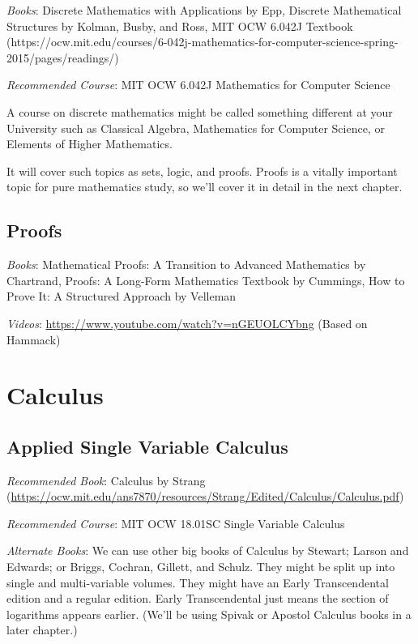 \documentclass[openany,10pt]{book}
\begin{document}
\textit{Books}: Discrete Mathematics with Applications by Epp, Discrete Mathematical Structures by Kolman, Busby, and Ross, MIT OCW 6.042J Textbook (https://ocw.mit.edu/courses/6-042j-mathematics-for-computer-science-spring-2015/pages/readings/)

\noindent \textit{Recommended Course}: MIT OCW 6.042J Mathematics for Computer Science\newline

\noindent A course on discrete mathematics might be called something different at your University such as Classical Algebra,  Mathematics for Computer Science, or Elements of Higher Mathematics.

It will cover such topics as sets, logic, and proofs.  Proofs is a vitally important topic for pure mathematics study, so we'll cover it in detail in the next chapter.


\chapter{Proofs}

\textit{Books}: Mathematical Proofs: A Transition to Advanced Mathematics by Chartrand, Proofs: A Long-Form Mathematics Textbook by Cummings, How to Prove It: A Structured Approach by Velleman

\textit{Videos}: \url{https://www.youtube.com/watch?v=nGEUOLCYbng} (Based on Hammack)

\part{Calculus}

\chapter{Applied Single Variable Calculus}

\textit{Recommended Book}: Calculus by Strang (\url{https://ocw.mit.edu/ans7870/resources/Strang/Edited/Calculus/Calculus.pdf})\newline

\noindent \textit{Recommended Course}: MIT OCW 18.01SC Single Variable Calculus\newline

\noindent \textit{Alternate Books}: We can use other big books of Calculus by Stewart; Larson and Edwards; or Briggs, Cochran, Gillett, and Schulz.  They might be split up into single and multi-variable volumes.  They might have an Early Transcendental edition and a regular edition.  Early Transcendental just means the section of logarithms appears earlier.  (We'll be using Spivak or Apostol Calculus books in a later chapter.) 
\end{document}

